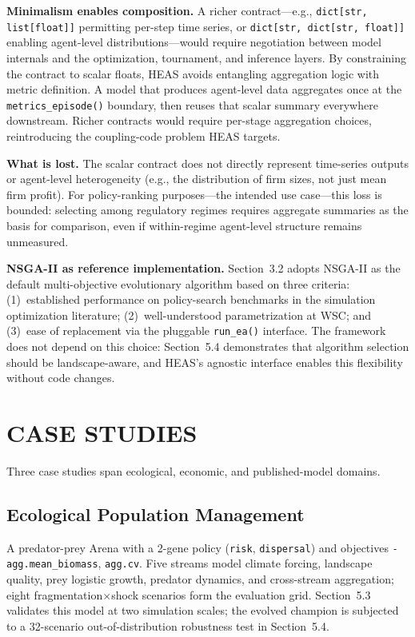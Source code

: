\documentclass{wscpaperproc}
\begin{document}
\textbf{Minimalism enables composition.} A richer contract---e.g.,
\texttt{dict[str, list[float]]} permitting per-step time series, or
\texttt{dict[str, dict[str, float]]} enabling agent-level distributions---would
require negotiation between model internals and the optimization, tournament, and
inference layers. By constraining the contract to scalar floats, HEAS avoids
entangling aggregation logic with metric definition. A model that produces
agent-level data aggregates once at the \texttt{metrics\_episode()} boundary, then
reuses that scalar summary everywhere downstream. Richer contracts would require
per-stage aggregation choices, reintroducing the coupling-code problem HEAS targets.

\textbf{What is lost.} The scalar contract does not directly represent time-series
outputs or agent-level heterogeneity (e.g., the distribution of firm sizes, not
just mean firm profit). For policy-ranking purposes---the intended use case---this
loss is bounded: selecting among regulatory regimes requires aggregate summaries
as the basis for comparison, even if within-regime agent-level structure remains
unmeasured.

\textbf{NSGA-II as reference implementation.} Section~3.2 adopts NSGA-II as the
default multi-objective evolutionary algorithm based on three criteria:
(1)~established performance on policy-search benchmarks in the simulation
optimization literature; (2)~well-understood parametrization at WSC; and
(3)~ease of replacement via the pluggable \texttt{run\_ea()} interface. The
framework does not depend on this choice: Section~5.4 demonstrates that algorithm
selection should be landscape-aware, and HEAS's agnostic interface enables this
flexibility without code changes.

\section{CASE STUDIES}

Three case studies span ecological, economic, and published-model domains.

\subsection{Ecological Population Management}

A predator-prey Arena with a 2-gene policy (\texttt{risk},
\texttt{dispersal}) and objectives \texttt{-agg.mean\_biomass},
\texttt{agg.cv}. Five streams model climate forcing, landscape quality, prey
logistic growth, predator dynamics, and cross-stream aggregation; eight
fragmentation$\times$shock scenarios form the evaluation grid.
Section~5.3 validates this model at two simulation scales; the evolved champion
is subjected to a 32-scenario out-of-distribution robustness test in
Section~5.4.
\end{document}
